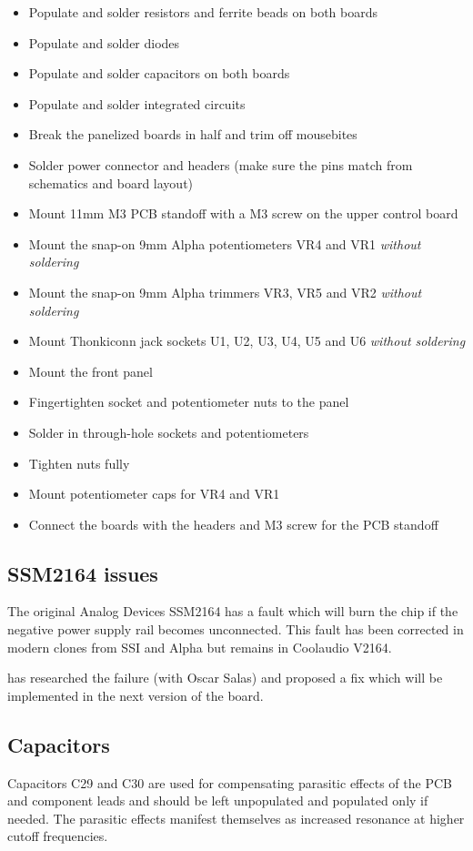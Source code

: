 \documentclass{article}
\begin{document}
\begin{itemize}
\item Populate and solder resistors and ferrite beads on both boards
\item Populate and solder diodes
\item Populate and solder capacitors on both boards
\item Populate and solder integrated circuits
\item Break the panelized boards in half and trim off mousebites
\item Solder power connector and headers (make sure the pins match from schematics and board layout)
\item Mount 11mm M3 PCB standoff with a M3 screw on the upper control board
\item Mount the snap-on 9mm Alpha potentiometers VR4 and VR1 \emph{without soldering}
\item Mount the snap-on 9mm Alpha trimmers VR3, VR5 and VR2 \emph{without soldering}
\item Mount Thonkiconn jack sockets U1, U2, U3, U4, U5 and U6 \emph{without soldering}
\item Mount the front panel
\item Fingertighten socket and potentiometer nuts to the panel
\item Solder in through-hole sockets and potentiometers
\item Tighten nuts fully
\item Mount potentiometer caps for VR4 and VR1
\item Connect the boards with the headers and M3 screw for the PCB standoff
\end{itemize}

\subsection{SSM2164 issues}
The original Analog Devices SSM2164 has a fault which will burn the chip if the negative power supply rail becomes unconnected. This fault has been corrected in modern clones from SSI and Alpha but remains in Coolaudio V2164.\newline

\cite{johnson} has researched the failure (with Oscar Salas) and proposed a fix which will be implemented in the next version of the board.

\subsection{Capacitors}
Capacitors C29 and C30 are used for compensating parasitic effects of the PCB and component leads and should be left unpopulated and populated only if needed. The parasitic effects manifest themselves as increased resonance at higher cutoff frequencies.
\end{document}
